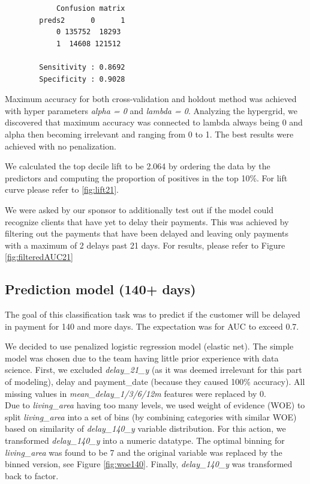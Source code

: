 \documentclass[
]{article}
\begin{document}
\begin{verbatim}
            Confusion matrix
        preds2      0      1
            0 135752  18293
            1  14608 121512
            
        Sensitivity : 0.8692          
        Specificity : 0.9028 
\end{verbatim}

Maximum accuracy for both cross-validation and holdout method was achieved with hyper parameters \emph{alpha = 0} and \emph{lambda = 0}. Analyzing the hypergrid, we discovered that maximum accuracy was connected to lambda always being 0 and alpha then becoming irrelevant and ranging from 0 to 1. The best results were achieved with no penalization.

We calculated the top decile lift to be 2.064 by ordering the data by the predictors and computing the proportion of positives in the top 10\%. For lift curve please refer to \ref{fig:lift21}.

We were asked by our sponsor to additionally test out if the model could recognize clients that have yet to delay their payments. This was achieved by filtering out the payments that have been delayed and leaving only payments with a maximum of 2 delays past 21 days. For results, please refer to Figure \ref{fig:filteredAUC21}

\hypertarget{prediction-model-140-days}{%
\subsection{Prediction model (140+ days)}\label{prediction-model-140-days}}

The goal of this classification task was to predict if the customer will be delayed in payment for 140 and more days. The expectation was for AUC to exceed 0.7.

We decided to use penalized logistic regression model (elastic net). The simple model was chosen due to the team having little prior experience with data science. First, we excluded \emph{delay\_21\_y} (as it was deemed irrelevant for this part of modeling), delay and payment\_date (because they caused 100\% accuracy). All missing values in \emph{mean\_delay\_1/3/6/12m} features were replaced by 0.\\
Due to \emph{living\_area} having too many levels, we used weight of evidence (WOE) to split \emph{living\_area} into a set of bins (by combining categories with similar WOE) based on similarity of \emph{delay\_140\_y} variable distribution. For this action, we transformed \emph{delay\_140\_y} into a numeric datatype. The optimal binning for \emph{living\_area} was found to be 7 and the original variable was replaced by the binned version, see Figure \ref{fig:woe140}. Finally, \emph{delay\_140\_y} was transformed back to factor.
\end{document}

